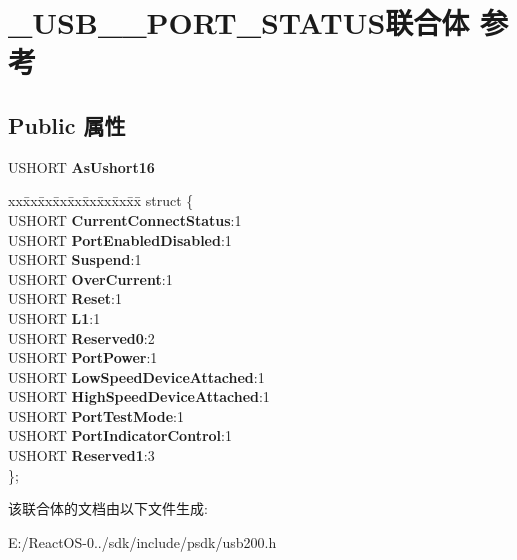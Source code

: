 \hypertarget{union___u_s_b__20___p_o_r_t___s_t_a_t_u_s}{}\section{\+\_\+\+U\+S\+B\+\_\+\_\+\+P\+O\+R\+T\+\_\+\+S\+T\+A\+T\+U\+S联合体 参考}
\label{union___u_s_b__20___p_o_r_t___s_t_a_t_u_s}
\subsection*{Public 属性}
\begin{DoxyCompactItemize}
\item 
\mbox{\label{union___u_s_b__20___p_o_r_t___s_t_a_t_u_s_ad1ad4b03532b08a4a4d30fd672184a0c}} 
U\+S\+H\+O\+RT {\bfseries As\+Ushort16}
\item 
\mbox{\label{union___u_s_b__20___p_o_r_t___s_t_a_t_u_s_a9ed269b6689eb5747d9e2e2e30984d3b}} 
\begin{tabbing}
xx\=xx\=xx\=xx\=xx\=xx\=xx\=xx\=xx\=\kill
struct \{\\
\>USHORT {\bfseries CurrentConnectStatus}:1\\
\>USHORT {\bfseries PortEnabledDisabled}:1\\
\>USHORT {\bfseries Suspend}:1\\
\>USHORT {\bfseries OverCurrent}:1\\
\>USHORT {\bfseries Reset}:1\\
\>USHORT {\bfseries L1}:1\\
\>USHORT {\bfseries Reserved0}:2\\
\>USHORT {\bfseries PortPower}:1\\
\>USHORT {\bfseries LowSpeedDeviceAttached}:1\\
\>USHORT {\bfseries HighSpeedDeviceAttached}:1\\
\>USHORT {\bfseries PortTestMode}:1\\
\>USHORT {\bfseries PortIndicatorControl}:1\\
\>USHORT {\bfseries Reserved1}:3\\
\}; \\

\end{tabbing}\end{DoxyCompactItemize}


该联合体的文档由以下文件生成\+:\begin{DoxyCompactItemize}
\item 
E\+:/\+React\+O\+S-\/0../sdk/include/psdk/usb200.\+h\end{DoxyCompactItemize}
